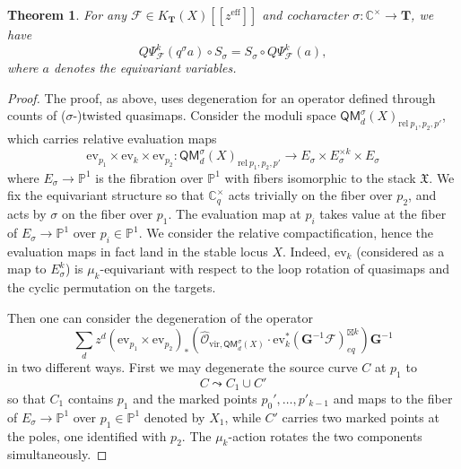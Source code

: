 \documentclass[reqno]{amsart}
\numberwithin{equation}{section}
\numberwithin{equation}{section}
\numberwithin{equation}{section}
\newtheorem{thm}{Theorem}[section]
\theoremstyle{definition}
\theoremstyle{remark}
\theoremstyle{remark}
\newcommand{\curly}{\mathrel{\leadsto}}
\begin{document}
\begin{thm}
    For any $\mathcal{F} \in K_{\mathbf{T}}(X)[\![ z^{\mathrm{eff}} ]\!]$ and cocharacter $\sigma: \mathbb{C}^{\times} \to \mathbf{T}$, we have
    \begin{equation}
        Q\Psi^k_{\mathcal{F}}(q^{\sigma} a) \circ S_{\sigma} = S_{\sigma} \circ Q\Psi^k_{\mathcal{F}}(a),
    \end{equation}
    where $a$ denotes the equivariant variables.
\end{thm}
\begin{proof}
    The proof, as above, uses degeneration for an operator defined through counts of ($\sigma$-)twisted quasimaps. Consider the moduli space $\mathsf{QM}_d^{\sigma}(X)_{\mathrm{rel} \ p_1, p_2, p'}$, which carries relative evaluation maps
    \begin{equation}
        \mathrm{ev}_{p_1} \times \mathrm{ev}_k \times \mathrm{ev}_{p_2} : \mathsf{QM}_d^{\sigma}(X)_{\mathrm{rel} \ p_1, p_2, p'} \to E_\sigma \times E_\sigma^{\times k} \times E_\sigma
    \end{equation}
    where $E_\sigma \to \mathbb{P}^1$ is the fibration over $\mathbb{P}^1$ with fibers isomorphic to the stack $\mathfrak{X}$. We fix the equivariant structure so that $\mathbb{C}^\times_q$ acts trivially on the fiber over $p_2$, and acts by $\sigma$ on the fiber over $p_1$. The evaluation map at $p_i$ takes value at the fiber of $E_\sigma \to \mathbb{P}^1$ over $p_i \in \mathbb{P}^1$. We consider the relative compactification, hence the evaluation maps in fact land in the stable locus $X$.  Indeed, $\mathrm{ev}_k$ (considered as a map to $E_\sigma^k$) is $\mu_k$-equivariant with respect to the loop rotation of quasimaps and the cyclic permutation on the targets.
    
    Then one can consider the degeneration of the operator
    \begin{equation}
        \sum_ d z^d (\mathrm{ev}_{p_1} \times \mathrm{ev}_{p_2} )_*  \left(  \hat{\mathcal{O}}_{\mathrm{vir} ,\mathsf{QM}_d^{\sigma} (X)} \cdot   \mathrm{ev}_k^* (\mathbf{G}^{-1}\mathcal{F})_{eq}^{\boxtimes k} \right) \mathbf{G}^{-1}
    \end{equation}
    in two different ways. First we may degenerate the source curve $C$ at $p_1$ to  \begin{equation}
        C \curly C_1 \cup C'
    \end{equation}
    so that $C_1$ contains $p_1$ and the marked points $p_0', \dots, p'_{k-1}$ and maps to the fiber of $E_\sigma \to \mathbb{P}^1$ over $p_1 \in \mathbb{P}^1$ denoted by $X_1$, while $C'$ carries two marked points at the poles, one identified with $p_2$. The $\mu_k$-action rotates the two components simultaneously.


\end{proof}
\end{document}
